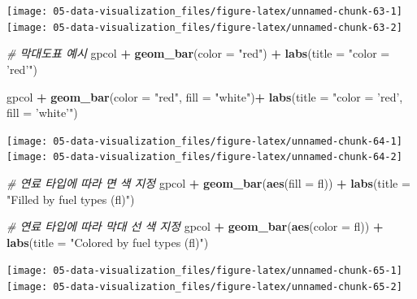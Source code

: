 \documentclass[
  11pt,
]{krantz}
\newenvironment{Shaded}{\begin{snugshade}}{\end{snugshade}}
\newcommand{\CommentTok}[1]{\textcolor[rgb]{0.37,0.37,0.37}{\textit{#1}}}
\newcommand{\DataTypeTok}[1]{\textcolor[rgb]{0.27,0.27,0.27}{#1}}
\newcommand{\KeywordTok}[1]{\textcolor[rgb]{0.27,0.27,0.27}{\textbf{#1}}}
\newcommand{\NormalTok}[1]{#1}
\newcommand{\OperatorTok}[1]{\textcolor[rgb]{0.43,0.43,0.43}{\textbf{#1}}}
\newcommand{\StringTok}[1]{\textcolor[rgb]{0.5,0.5,0.5}{#1}}
\begin{document}
\texttt{[image: 05-data-visualization\_files/figure-latex/unnamed-chunk-63-1]} \texttt{[image: 05-data-visualization\_files/figure-latex/unnamed-chunk-63-2]}

\normalsize

\footnotesize

\begin{Shaded}
\begin{Highlighting}[]
\CommentTok{# 막대도표 예시}
\NormalTok{gpcol }\OperatorTok{+}\StringTok{ }\KeywordTok{geom_bar}\NormalTok{(}\DataTypeTok{color =} \StringTok{"red"}\NormalTok{) }\OperatorTok{+}\StringTok{ }
\StringTok{  }\KeywordTok{labs}\NormalTok{(}\DataTypeTok{title =} \StringTok{"color = 'red'"}\NormalTok{)}

\NormalTok{gpcol }\OperatorTok{+}\StringTok{ }\KeywordTok{geom_bar}\NormalTok{(}\DataTypeTok{color =} \StringTok{"red"}\NormalTok{, }\DataTypeTok{fill =} \StringTok{"white"}\NormalTok{)}\OperatorTok{+}\StringTok{ }
\StringTok{    }\KeywordTok{labs}\NormalTok{(}\DataTypeTok{title =} \StringTok{"color = 'red', fill = 'white'"}\NormalTok{)}
\end{Highlighting}
\end{Shaded}

\texttt{[image: 05-data-visualization\_files/figure-latex/unnamed-chunk-64-1]} \texttt{[image: 05-data-visualization\_files/figure-latex/unnamed-chunk-64-2]}

\normalsize

\footnotesize

\begin{Shaded}
\begin{Highlighting}[]
\CommentTok{# 연료 타입에 따라 면 색 지정}
\NormalTok{gpcol }\OperatorTok{+}\StringTok{ }
\StringTok{  }\KeywordTok{geom_bar}\NormalTok{(}\KeywordTok{aes}\NormalTok{(}\DataTypeTok{fill =}\NormalTok{ fl)) }\OperatorTok{+}\StringTok{ }
\StringTok{  }\KeywordTok{labs}\NormalTok{(}\DataTypeTok{title =} \StringTok{"Filled by fuel types (fl)"}\NormalTok{)}

\CommentTok{# 연료 타입에 따라 막대 선 색 지정}
\NormalTok{gpcol }\OperatorTok{+}\StringTok{ }
\StringTok{  }\KeywordTok{geom_bar}\NormalTok{(}\KeywordTok{aes}\NormalTok{(}\DataTypeTok{color =}\NormalTok{ fl)) }\OperatorTok{+}\StringTok{ }
\StringTok{  }\KeywordTok{labs}\NormalTok{(}\DataTypeTok{title =} \StringTok{"Colored by fuel types (fl)"}\NormalTok{)}
\end{Highlighting}
\end{Shaded}

\texttt{[image: 05-data-visualization\_files/figure-latex/unnamed-chunk-65-1]} \texttt{[image: 05-data-visualization\_files/figure-latex/unnamed-chunk-65-2]}
\end{document}

